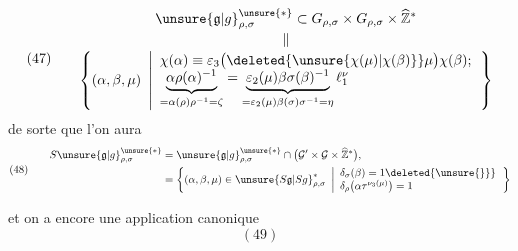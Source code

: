\[
(47)\qquad
\begin{gathered}
\unsure{\mathfrak{g}|g}_{\rho,\sigma}^{\unsure{*}}
\subset G_{\rho,\sigma}\times G_{\rho,\sigma}
\times\widehat{\mathbb Z}^{*}
\\[-2pt]
\Vert\\[-2pt]
\left\{(\alpha,\beta,\mu)\ \left|
\begin{array}{l}
\chi(\alpha)\equiv\varepsilon_3
\bigl(\deleted{\unsure{\chi(\mu)|\chi(\beta)}}\mu\bigr)
\chi(\beta);\\
\underbrace{\alpha\rho(\alpha)^{-1}}_{=\alpha(\rho)\rho^{-1}=\zeta}
=
\underbrace{\varepsilon_2(\mu)\beta\sigma(\beta)^{-1}}_
{=\varepsilon_2(\mu)\beta(\sigma)\sigma^{-1}=\eta}
\ell_1^\nu
\end{array}\right.\right\}
\end{gathered}
\]
de sorte que l'on aura
\[
(48)\qquad
\begin{aligned}
S\unsure{\mathfrak{g}|g}_{\rho,\sigma}^{\unsure{*}}
&=\unsure{\mathfrak{g}|g}_{\rho,\sigma}^{\unsure{*}}
\cap\bigl(\mathcal{G}'\times\mathcal{G}\times\widehat{\mathbb Z}^{*}\bigr),
\\
&=\left\{(\alpha,\beta,\mu)\in
\unsure{S\mathfrak{g}|Sg}_{\rho,\sigma}^{*}
\ \left|
\begin{array}{l}
\delta_\sigma(\beta)=1\deleted{\unsure{\}}}\\
\delta_\rho\bigl(\alpha\tau^{\nu_3(\mu)}\bigr)=1
\end{array}\right.\right\}
\end{aligned}
\]


et on a encore une application canonique
\[
(49)
\]

